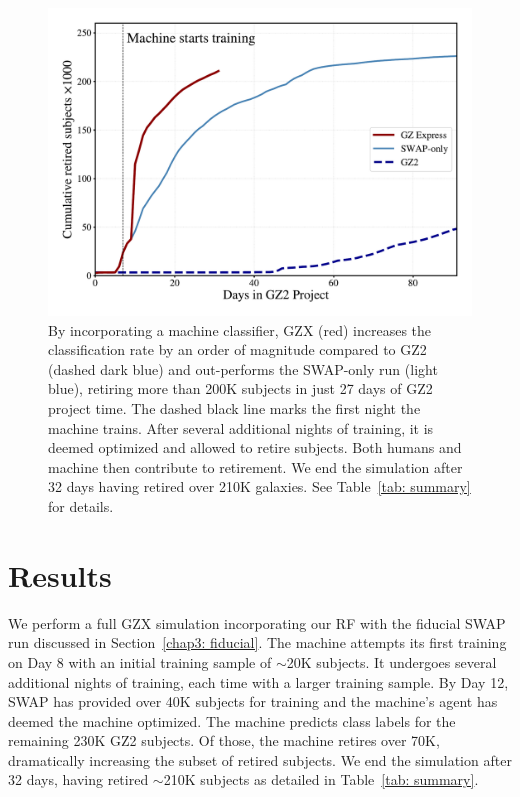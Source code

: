 \begin{figure}
\centering
\includegraphics[width=\textwidth]{Figures/human_machine/GZ2_sup_PLPD5_p5_flipfeature2b_moneyplot.pdf}
\caption[Performance of the human+machine combination -- Galaxy Zoo: Express]{By incorporating a machine classifier, GZX (red) increases the classification rate by an order of magnitude compared to GZ2 (dashed dark blue) and out-performs the SWAP-only run (light blue), retiring more than 200K subjects in just 27 days of GZ2 project time. The dashed black line marks the first night the machine trains. After several additional nights of training, it is deemed optimized and allowed to retire subjects. Both humans and machine then contribute to retirement. We end the simulation after 32 days having retired over 210K galaxies. See Table~\ref{tab: summary} for details. \label{fig: money}}
\end{figure}


\section{Results} \label{chap4: results}
We perform a full GZX simulation incorporating our RF with the fiducial 
SWAP run discussed in Section~\ref{chap3: fiducial}. The machine attempts its first training on Day 8 with an initial training sample of $\sim$20K subjects. It undergoes several additional nights of training, each time with a larger training sample. By Day 12, SWAP has provided over 40K subjects for training and the machine's agent has deemed the machine optimized. The machine predicts class labels for the remaining 230K GZ2 subjects. Of those, the machine retires over 70K, dramatically increasing the subset of retired subjects. We end the simulation after 32 days, having retired $\sim$210K subjects as detailed in Table~\ref{tab: summary}. 

